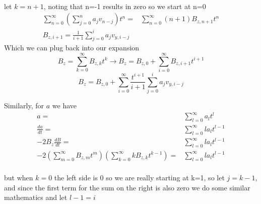 \documentclass[9pt]{article}
\begin{document}
\begin{multicols}{2}
\begin{equation}
\begin{split}
        \end{split}
    \end{equation}
let $k=n+1$, noting that n=-1 results in zero so we start at n=0
    \begin{equation}
        \begin{split}            
            \sum_{n=0}^\infty \left(\sum_{j=0}^n a_jv_{n-j}\right)t^n=&\sum_{n=0}^\infty (n+1)B_{z,n+1}t^{n}\\
            B_{z,i+1}=\frac{1}{i+1}\sum_{j=0}^i a_jv_{y,i-j}
        \end{split}
    \end{equation}
Which we can plug back into our expansion
$$        B_z=\sum_{k=0}^\infty B_{z,k}t^k\longrightarrow B_z=B_{z,0}+\sum_{i=0}^\infty B_{z,i+1}t^{i+1}$$
    \begin{equation}
        \boxed{B_z=B_{z,0}+\sum_{i=0}^\infty \frac{t^{i+1}}{i+1}\sum_{j=0}^i a_jv_{y,i-j}}
    \end{equation}
    
Similarly, for $a$ we have
    \begin{equation}
        \begin{split}
            a=&\sum_{l=0}^\infty a_lt^l\\
            \frac{da}{dt}=&\sum_{l=0}^\infty la_lt^{l-1}\\
            -2B_z\frac{dB}{dt}=&\sum_{l=0}^\infty la_lt^{l-1}\\
            -2\left(\sum_{m=0}^\infty B_{z,m}t^m\right)\left(\sum_{k=0}^\infty kB_{z,k}t^{k-1}\right)=&\sum_{l=0}^\infty la_lt^{l-1}\\
            \end{split}
    \end{equation}
            
but when $k=0$ the left side is 0 so we are really starting at k=1, so let $j=k-1$, and since the first term for the sum on the right is also zero we do some similar mathematics and let $l-1=i$
            

\end{multicols}
\end{document}
